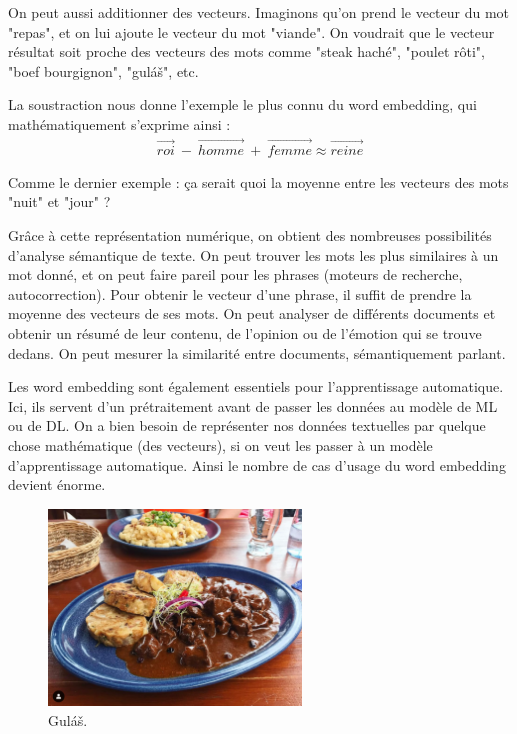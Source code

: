 \documentclass[11pt, a4paper]{report}
\begin{document}
On peut aussi additionner des vecteurs. Imaginons qu'on prend le vecteur du mot "repas", et on lui 
ajoute le vecteur du mot "viande". On voudrait que le vecteur résultat soit proche des vecteurs 
des mots comme "steak haché", "poulet rôti", "boef bourgignon", "guláš", etc. 

La soustraction nous donne l'exemple le plus connu du word embedding, qui mathématiquement 
s'exprime ainsi : 
\begin{align*}
  \overrightarrow{roi} \ - \ \overrightarrow{homme} \ + \ \overrightarrow{femme} \approx \overrightarrow{reine}
\end{align*}

Comme le dernier exemple : ça serait quoi la moyenne entre les vecteurs des mots "nuit" et "jour" ?


Grâce à cette représentation numérique, on obtient des nombreuses 
possibilités d'analyse sémantique de texte. On peut trouver les mots les plus similaires à un mot donné, 
et on peut faire pareil pour les phrases (moteurs de recherche, autocorrection). Pour obtenir 
le vecteur d'une phrase, il suffit de prendre la moyenne des vecteurs de ses mots.  
On peut analyser de différents documents et obtenir un résumé de leur contenu, de l'opinion 
ou de l'émotion qui se trouve dedans. On peut mesurer la similarité entre documents, sémantiquement
parlant. 

Les word embedding sont également essentiels pour l'apprentissage automatique. 
Ici, ils servent d'un prétraitement avant de passer les données au modèle de ML ou de DL. 
On a bien besoin de représenter nos données textuelles par quelque chose mathématique (des vecteurs), 
si on veut les passer à un modèle d'apprentissage automatique. Ainsi le nombre de cas d'usage 
du word embedding devient énorme. 

\begin{figure}[h]
  \centering
  \includegraphics[width=0.6\textwidth]{gulas.png}
  \caption{Guláš.}
  \label{fig:gulas}
\end{figure}
\end{document}
